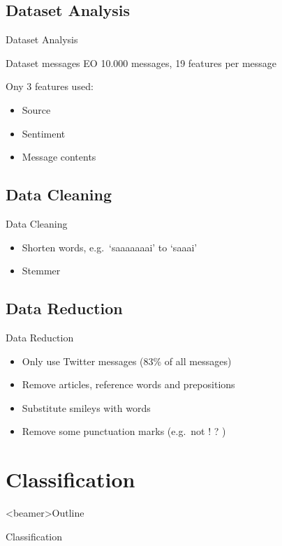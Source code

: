 \documentclass{beamer}
\begin{document}
\subsection{Dataset Analysis}
\begin{frame}{Dataset Analysis}
\begin{block}{Dataset messages EO}
10.000 messages, 19 features per message
\end{block}
Ony 3 features used: \\
\begin{itemize}
\item Source
\item Sentiment
\item Message contents
\end{itemize}
\end{frame}


\subsection{Data Cleaning}
\begin{frame}{Data Cleaning}
\begin{itemize}
\item Shorten words, e.g.\ `saaaaaaai' to `saaai'
\item Stemmer
\end{itemize}
\end{frame}

\subsection{Data Reduction}
\begin{frame}{Data Reduction}
\begin{itemize}
\item Only use Twitter messages (83\% of all messages)
\item Remove articles, reference words and prepositions
\item Substitute smileys with words
\item Remove some punctuation marks (e.g.\ not ! ? )
\end{itemize}
\end{frame}

\section{Classification}
\begin{frame}<beamer>{Outline}
    \setcounter{tocdepth}{2}
    \tableofcontents[
    currentsubsection, 
    hideothersubsections, 
    sectionstyle=show/hide] 
  \end{frame}
\begin{frame}{Classification}
\end{frame}
\end{document}

